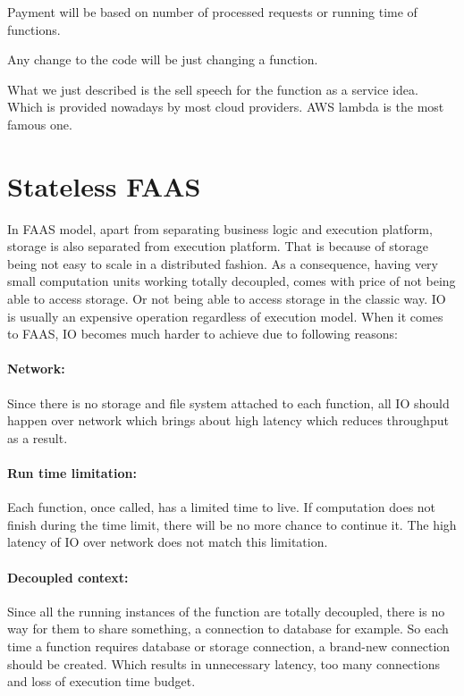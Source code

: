 \documentclass[a4]{report}
\begin{document}
    Payment will be based on number of processed requests or running time of functions.

    Any change to the code will be just changing a function.

    What we just described is the sell speech for the function as a service idea.
    Which is provided nowadays by most cloud providers.
    AWS lambda\cite{lambda} is the most famous one.


    \section{Stateless FAAS}
    In FAAS model, apart from separating business logic and execution platform, storage is also separated from
    execution platform.
    That is because of storage being not easy to scale in a distributed fashion.
    As a consequence, having very small computation units working totally decoupled, comes with price of not being
    able to access storage.
    Or not being able to access storage in the classic way.
    IO is usually an expensive operation regardless of execution model.
    When it comes to FAAS, IO becomes much harder to achieve due to following reasons:

    \paragraph{Network:} Since there is no storage and file system attached to each function, all IO should happen
    over network which brings about high latency which reduces throughput as a result.

    \paragraph{Run time limitation:} Each function, once called, has a limited time to live.
    If computation does not finish during the time limit, there will be no more chance to continue it.
    The high latency of IO over network does not match this limitation.

    \paragraph{Decoupled context:} Since all the running instances of the function are totally decoupled, there is
    no way for them to share something, a connection to database for example.
    So each time a function requires database or storage connection, a brand-new connection should be created.
    Which results in unnecessary latency, too many connections and loss of execution time budget.
\end{document}

